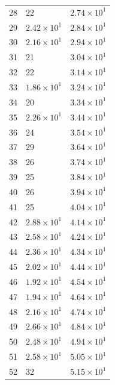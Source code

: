 \begin{table}[H]
\begin{tabular}{lll}
28 & 22 & $\displaystyle 2.74 \times 10^{1}$ \\
29 & $\displaystyle 2.42 \times 10^{1}$ & $\displaystyle 2.84 \times 10^{1}$ \\
30 & $\displaystyle 2.16 \times 10^{1}$ & $\displaystyle 2.94 \times 10^{1}$ \\
31 & 21 & $\displaystyle 3.04 \times 10^{1}$ \\
32 & 22 & $\displaystyle 3.14 \times 10^{1}$ \\
33 & $\displaystyle 1.86 \times 10^{1}$ & $\displaystyle 3.24 \times 10^{1}$ \\
34 & 20 & $\displaystyle 3.34 \times 10^{1}$ \\
35 & $\displaystyle 2.26 \times 10^{1}$ & $\displaystyle 3.44 \times 10^{1}$ \\
36 & 24 & $\displaystyle 3.54 \times 10^{1}$ \\
37 & 29 & $\displaystyle 3.64 \times 10^{1}$ \\
38 & 26 & $\displaystyle 3.74 \times 10^{1}$ \\
39 & 25 & $\displaystyle 3.84 \times 10^{1}$ \\
40 & 26 & $\displaystyle 3.94 \times 10^{1}$ \\
41 & 25 & $\displaystyle 4.04 \times 10^{1}$ \\
42 & $\displaystyle 2.88 \times 10^{1}$ & $\displaystyle 4.14 \times 10^{1}$ \\
43 & $\displaystyle 2.58 \times 10^{1}$ & $\displaystyle 4.24 \times 10^{1}$ \\
44 & $\displaystyle 2.36 \times 10^{1}$ & $\displaystyle 4.34 \times 10^{1}$ \\
45 & $\displaystyle 2.02 \times 10^{1}$ & $\displaystyle 4.44 \times 10^{1}$ \\
46 & $\displaystyle 1.92 \times 10^{1}$ & $\displaystyle 4.54 \times 10^{1}$ \\
47 & $\displaystyle 1.94 \times 10^{1}$ & $\displaystyle 4.64 \times 10^{1}$ \\
48 & $\displaystyle 2.16 \times 10^{1}$ & $\displaystyle 4.74 \times 10^{1}$ \\
49 & $\displaystyle 2.66 \times 10^{1}$ & $\displaystyle 4.84 \times 10^{1}$ \\
50 & $\displaystyle 2.48 \times 10^{1}$ & $\displaystyle 4.94 \times 10^{1}$ \\
51 & $\displaystyle 2.58 \times 10^{1}$ & $\displaystyle 5.05 \times 10^{1}$ \\
52 & 32 & $\displaystyle 5.15 \times 10^{1}$ \\

\end{tabular}
\end{table}
